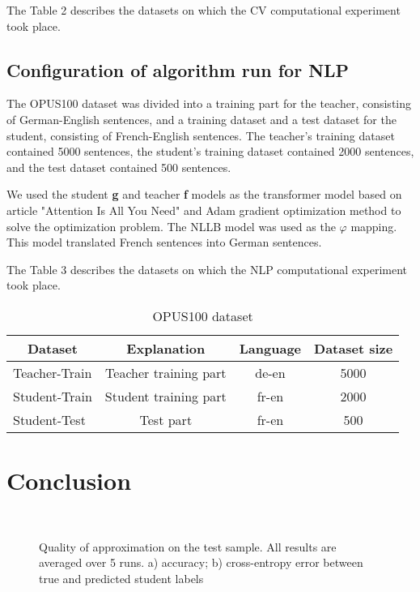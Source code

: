 \documentclass[12pt]{article}
\begin{document}
The Table 2 describes the datasets on which the CV computational experiment took place.


\subsection{Configuration of algorithm run for NLP} 

The OPUS100 dataset was divided into a training part for the teacher, consisting of German-English sentences, and a training dataset and a test dataset for the student, consisting of French-English sentences. The teacher's training dataset contained 5000 sentences, the student's training dataset contained 2000 sentences, and the test dataset contained 500 sentences.

We used the student \textbf{g} and teacher \textbf{f} models as the transformer model based on article "Attention Is All You Need" \citep{Attention} and Adam gradient optimization method \citep{Adam} to solve the optimization problem. The NLLB model\citep{nllb} was used as the $\varphi$ mapping. This model translated French sentences into German sentences.

The Table 3 describes the datasets on which the NLP computational experiment took place.

\begin{table}[h!t]
\begin{center}
\caption{OPUS100 dataset}
\label{table_10}
\begin{tabular}{|c|c|c|c|}
\hline
	Dataset & Explanation & Language & Dataset size\\
	\hline
	\multicolumn{1}{|l|}{Teacher-Train}
	& Teacher training part & de-en & 5000\\
	\hline
	\multicolumn{1}{|l|}{Student-Train}
	& Student training part& fr-en & 2000\\
	\hline
	\multicolumn{1}{|l|}{Student-Test}
	& Test part & fr-en & 500\\
\hline
\end{tabular}
\end{center}
\end{table}

\section{Conclusion}

\begin{figure}[h!t]\center
{}
\\
\caption{Quality of approximation on the test sample. All results are averaged over 5 runs. a) accuracy; b) cross-entropy error between true and predicted student labels}
\end{figure}
\end{document}

